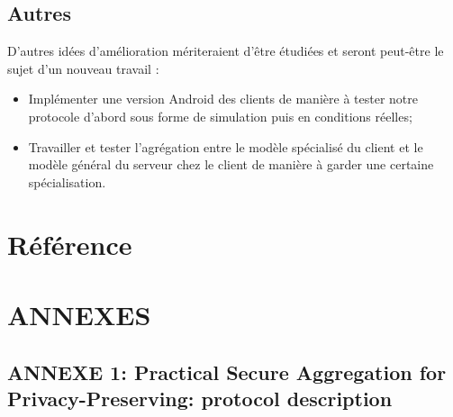 \documentclass{article}
\begin{document}
\subsection{Autres}
D'autres idées d'amélioration mériteraient d'être étudiées et seront peut-être le sujet d'un nouveau travail :
\begin{itemize}
    \item Implémenter une version Android des clients de manière à tester notre protocole d'abord sous forme de simulation puis en conditions réelles;
    \item Travailler et tester l'agrégation entre le modèle spécialisé du client et le modèle général du serveur chez le client de manière à garder une certaine spécialisation.
\end{itemize}

\section{Référence}
\printbibliography

\section{ANNEXES}
\subsection{ANNEXE 1: Practical Secure Aggregation for Privacy-Preserving: protocol description}

\end{document}
